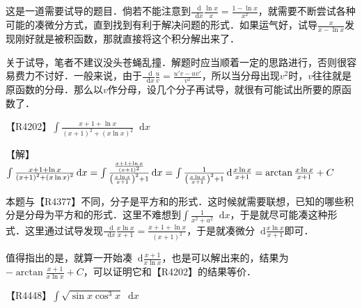 \documentclass{ctexbook}
\newcommand*{\dif}{\mathop{}\!\mathrm{d}}
\begin{document}
{\kaishu 这是一道需要试导的题目．倘若不能注意到$\frac{\dif{}}{\dif{x}}\frac{\ln{x}}{x}=\frac{1-\ln{x}}{x^{2}}$，就需要不断尝试各种可能的凑微分方式，直到找到有利于解决问题的形式．如果运气好，试导$\frac{x}{x-\ln{x}}$发现刚好就是被积函数，那就直接将这个积分解出来了．\par
关于试导，笔者不建议没头苍蝇乱撞．解题时应当顺着一定的思路进行，否则很容易费力不讨好．一般来说，由于$\frac{\dif}{\dif{x}}\frac{u}{v}=\frac{u'v-uv'}{v^{2}}$，所以当分母出现$v^{2}$时，$v$往往就是原函数的分母．那么以$v$作分母，设几个分子再试导，就很有可能试出所要的原函数了．}\par
【R4202】$\int\frac{x+1+\ln{x}}{\left(x+1\right)^{2}+\left(x\ln{x}\right)^{2}}\dif{x}$\par
【解】$\int\frac{x+1+\ln{x}}{\left(x+1\right)^{2}+\left(x\ln{x}\right)^{2}}\dif{x}\\=\int\frac{\frac{x+1+\ln{x}}{\left(x+1\right)^{2}}}{\left(\frac{x\ln{x}}{x+1}\right)^{2}+1}\dif{x}\\=\int\frac{1}{\left(\frac{x\ln{x}}{x+1}\right)^{2}+1}\dif{\frac{x\ln{x}}{x+1}}\\=\arctan{\frac{x\ln{x}}{x+1}}+C$\par
{\kaishu 本题与【R4377】不同，分子是平方和的形式．这时候就需要联想，已知的哪些积分是分母为平方和的形式．这里不难想到$\int\frac{1}{x^{2}+a^{2}}\dif{x}$，于是就尽可能凑这种形式．这里通过试导发现$\frac{\dif{}}{\dif{x}}\frac{x\ln{x}}{x+1}=\frac{x+1+\ln{x}}{\left(x+1\right)^{2}}$，于是就凑微分$\dif{\frac{x\ln{x}}{x+1}}$即可．\par
值得指出的是，就算一开始凑$\dif{\frac{x+1}{x\ln{x}}}$，也是可以解出来的，结果为$-\arctan{\frac{x+1}{x\ln{x}}}+C$，可以证明它和【R4202】的结果等价．}\par
【R4448】$\int\sqrt{\sin{x}\cos^{3}{x}}\dif{x}$\par
\end{document}
